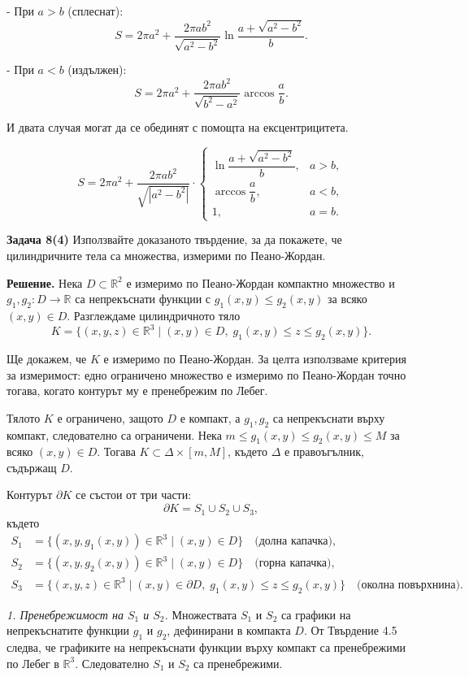 \documentclass[10pt]{article}
\begin{document}
- При $a > b$ (сплеснат):
\[
S = 2\pi a^2 + \frac{2\pi a b^2}{\sqrt{a^2-b^2}} \ln\frac{a+\sqrt{a^2-b^2}}{b}.
\]

- При $a < b$ (издължен):
\[
S = 2\pi a^2 + \frac{2\pi a b^2}{\sqrt{b^2-a^2}} \arccos\frac{a}{b}.
\]

И двата случая могат да се обединят с помощта на ексцентрицитета.

\[
\boxed{S = 2\pi a^2 + \frac{2\pi a b^2}{\sqrt{|a^2-b^2|}} \cdot \begin{cases}
\ln\dfrac{a+\sqrt{a^2-b^2}}{b}, & a > b, \\[6pt]
\arccos\dfrac{a}{b}, & a < b, \\[6pt]
1, & a = b.
\end{cases}}
\]



\textbf{Задача 8(4) }Използвайте доказаното твърдение, за да покажете, че цилиндричните тела са множества, измерими по Пеано-Жордан. 

\textbf{Решение.} 
Нека $D \subset \mathbb{R}^2$ е измеримо по Пеано-Жордан компактно множество и $g_1,g_2 : D \to \mathbb{R}$ са непрекъснати функции с $g_1(x,y) \le g_2(x,y)$ за всяко $(x,y) \in D$.  
Разглеждаме цилиндричното тяло
\[
K = \{(x,y,z) \in \mathbb{R}^3 \mid (x,y) \in D,\; g_1(x,y) \le z \le g_2(x,y)\}.
\]

Ще докажем, че $K$ е измеримо по Пеано-Жордан. За целта използваме критерия за измеримост: едно ограничено множество е измеримо по Пеано-Жордан точно тогава, когато контурът му е пренебрежим по Лебег.

Тялото $K$ е ограничено, защото $D$ е компакт, а $g_1,g_2$ са непрекъснати върху компакт, следователно са ограничени. Нека $m \le g_1(x,y) \le g_2(x,y) \le M$ за всяко $(x,y) \in D$. Тогава $K \subset \Delta \times [m,M]$, където $\Delta$ е правоъгълник, съдържащ $D$.

Контурът $\partial K$ се състои от три части:
\[
\partial K = S_1 \cup S_2 \cup S_3,
\]
където
\begin{align*}
S_1 &= \{(x,y,g_1(x,y)) \in \mathbb{R}^3 \mid (x,y) \in D\} \quad \text{(долна капачка)},\\
S_2 &= \{(x,y,g_2(x,y)) \in \mathbb{R}^3 \mid (x,y) \in D\} \quad \text{(горна капачка)},\\
S_3 &= \{(x,y,z) \in \mathbb{R}^3 \mid (x,y) \in \partial D,\; g_1(x,y) \le z \le g_2(x,y)\} \quad \text{(околна повърхнина)}.
\end{align*}

\textit{1. Пренебрежимост на $S_1$ и $S_2$.} 
Множествата $S_1$ и $S_2$ са графики на непрекъснатите функции $g_1$ и $g_2$, дефинирани в компакта $D$. От Твърдение 4.5 следва, че графиките на непрекъснати функции върху компакт са пренебрежими по Лебег в $\mathbb{R}^3$. Следователно $S_1$ и $S_2$ са пренебрежими.
\end{document}
